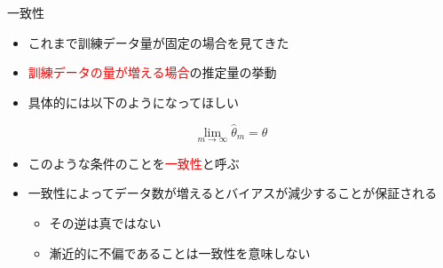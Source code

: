 \documentclass[dvipdfmx, 10pt]{beamer}
\begin{document}

\begin{frame}{一致性}
  \begin{itemize}
    \item これまで訓練データ量が固定の場合を見てきた
    \item \textcolor{red}{訓練データの量が増える場合}の推定量の挙動
    \item 具体的には以下のようになってほしい
  \end{itemize}
  \begin{equation}
    \lim_{m \to \infty} \hat{\theta}_{m} = \theta
  \end{equation}
  \begin{itemize}
    \item このような条件のことを\textcolor{red}{一致性}と呼ぶ
    \item 一致性によってデータ数が増えるとバイアスが減少することが保証される
    \begin{itemize}
      \item その逆は真ではない
      \item 漸近的に不偏であることは一致性を意味しない
    \end{itemize}
  \end{itemize}
\end{frame}

\end{document}
